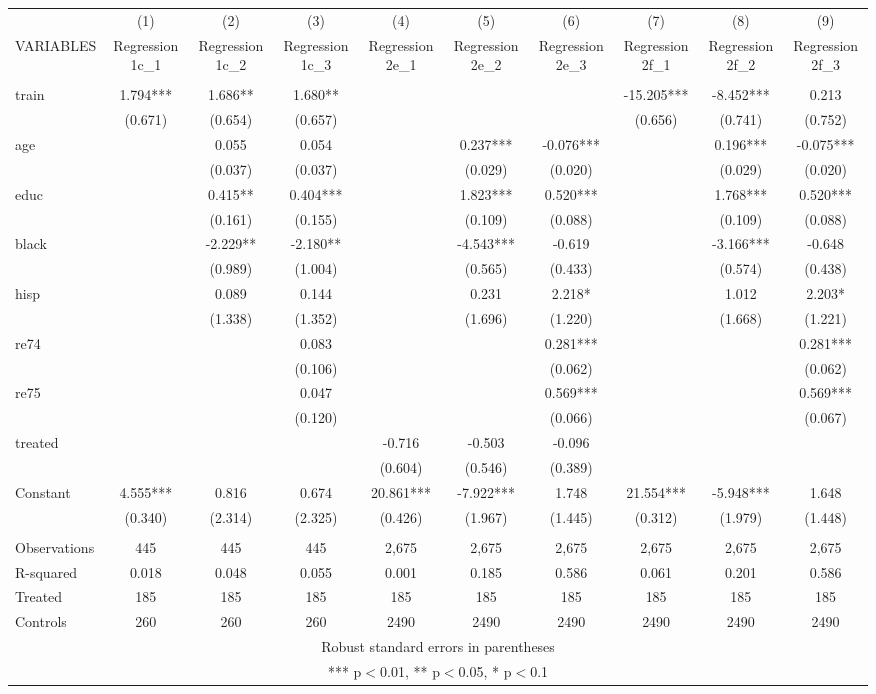 \documentclass[]{article}
\begin{document}
\begin{tabular}{lccccccccc} \hline
 & (1) & (2) & (3) & (4) & (5) & (6) & (7) & (8) & (9) \\
VARIABLES & Regression 1c\_1 & Regression 1c\_2 & Regression 1c\_3 & Regression 2e\_1 & Regression 2e\_2 & Regression 2e\_3 & Regression 2f\_1 & Regression 2f\_2 & Regression 2f\_3 \\ \hline
 &  &  &  &  &  &  &  &  &  \\
train & 1.794*** & 1.686** & 1.680** &  &  &  & -15.205*** & -8.452*** & 0.213 \\
 & (0.671) & (0.654) & (0.657) &  &  &  & (0.656) & (0.741) & (0.752) \\
age &  & 0.055 & 0.054 &  & 0.237*** & -0.076*** &  & 0.196*** & -0.075*** \\
 &  & (0.037) & (0.037) &  & (0.029) & (0.020) &  & (0.029) & (0.020) \\
educ &  & 0.415** & 0.404*** &  & 1.823*** & 0.520*** &  & 1.768*** & 0.520*** \\
 &  & (0.161) & (0.155) &  & (0.109) & (0.088) &  & (0.109) & (0.088) \\
black &  & -2.229** & -2.180** &  & -4.543*** & -0.619 &  & -3.166*** & -0.648 \\
 &  & (0.989) & (1.004) &  & (0.565) & (0.433) &  & (0.574) & (0.438) \\
hisp &  & 0.089 & 0.144 &  & 0.231 & 2.218* &  & 1.012 & 2.203* \\
 &  & (1.338) & (1.352) &  & (1.696) & (1.220) &  & (1.668) & (1.221) \\
re74 &  &  & 0.083 &  &  & 0.281*** &  &  & 0.281*** \\
 &  &  & (0.106) &  &  & (0.062) &  &  & (0.062) \\
re75 &  &  & 0.047 &  &  & 0.569*** &  &  & 0.569*** \\
 &  &  & (0.120) &  &  & (0.066) &  &  & (0.067) \\
treated &  &  &  & -0.716 & -0.503 & -0.096 &  &  &  \\
 &  &  &  & (0.604) & (0.546) & (0.389) &  &  &  \\
Constant & 4.555*** & 0.816 & 0.674 & 20.861*** & -7.922*** & 1.748 & 21.554*** & -5.948*** & 1.648 \\
 & (0.340) & (2.314) & (2.325) & (0.426) & (1.967) & (1.445) & (0.312) & (1.979) & (1.448) \\
 &  &  &  &  &  &  &  &  &  \\
Observations & 445 & 445 & 445 & 2,675 & 2,675 & 2,675 & 2,675 & 2,675 & 2,675 \\
R-squared & 0.018 & 0.048 & 0.055 & 0.001 & 0.185 & 0.586 & 0.061 & 0.201 & 0.586 \\
Treated & 185 & 185 & 185 & 185 & 185 & 185 & 185 & 185 & 185 \\
 Controls & 260 & 260 & 260 & 2490 & 2490 & 2490 & 2490 & 2490 & 2490 \\ \hline
\multicolumn{10}{c}{ Robust standard errors in parentheses} \\
\multicolumn{10}{c}{ *** p$<$0.01, ** p$<$0.05, * p$<$0.1} \\
\end{tabular}
\end{document}
